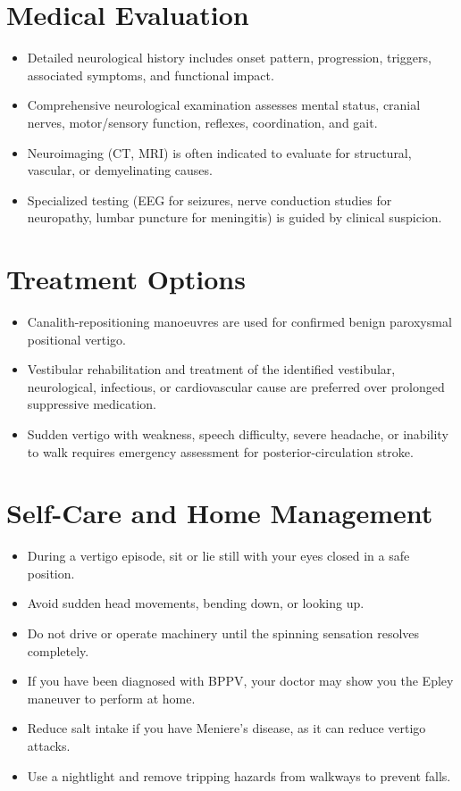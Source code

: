 \section*{Medical Evaluation}
\begin{itemize}
  \item Detailed neurological history includes onset pattern, progression, triggers, associated symptoms, and functional impact.
  \item Comprehensive neurological examination assesses mental status, cranial nerves, motor/sensory function, reflexes, coordination, and gait.
  \item Neuroimaging (CT, MRI) is often indicated to evaluate for structural, vascular, or demyelinating causes.
  \item Specialized testing (EEG for seizures, nerve conduction studies for neuropathy, lumbar puncture for meningitis) is guided by clinical suspicion.
\end{itemize}

\section*{Treatment Options}
\begin{itemize}
  \item Canalith-repositioning manoeuvres are used for confirmed benign paroxysmal positional vertigo.
  \item Vestibular rehabilitation and treatment of the identified vestibular, neurological, infectious, or cardiovascular cause are preferred over prolonged suppressive medication.
  \item Sudden vertigo with weakness, speech difficulty, severe headache, or inability to walk requires emergency assessment for posterior-circulation stroke.
\end{itemize}

\section*{Self-Care and Home Management}
\begin{itemize}
  \item During a vertigo episode, sit or lie still with your eyes closed in a safe position.
  \item Avoid sudden head movements, bending down, or looking up.
  \item Do not drive or operate machinery until the spinning sensation resolves completely.
  \item If you have been diagnosed with BPPV, your doctor may show you the Epley maneuver to perform at home.
  \item Reduce salt intake if you have Meniere's disease, as it can reduce vertigo attacks.
  \item Use a nightlight and remove tripping hazards from walkways to prevent falls.
\end{itemize}

